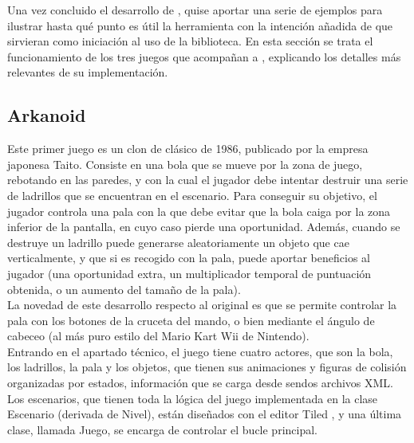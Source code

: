 



Una vez concluido el desarrollo de , quise aportar una serie de ejemplos para ilustrar hasta qué punto es útil la herramienta con la intención añadida de que sirvieran como iniciación al uso de la biblioteca. En esta sección se trata el funcionamiento de los tres juegos que acompañan a , explicando los detalles más relevantes de su implementación.

\subsection{Arkanoid}

Este primer juego es un clon de clásico de 1986, publicado por la empresa japonesa Taito. Consiste en una bola que se mueve por la zona de juego, rebotando en las paredes, y con la cual el jugador debe intentar destruir una serie de ladrillos que se encuentran en el escenario. Para conseguir su objetivo, el jugador controla una pala con la que debe evitar que la bola caiga por la zona inferior de la pantalla, en cuyo caso pierde una oportunidad. Además, cuando se destruye un ladrillo puede generarse aleatoriamente un objeto que cae verticalmente, y que si es recogido con la pala, puede aportar beneficios al jugador (una oportunidad extra, un multiplicador temporal de puntuación obtenida, o un aumento del tamaño de la pala).\\

La novedad de este desarrollo respecto al original es que se permite controlar la pala con los botones de la cruceta del mando, o bien mediante el ángulo de cabeceo (al más puro estilo del Mario Kart Wii de Nintendo).\\

Entrando en el apartado técnico, el juego tiene cuatro actores, que son la bola, los ladrillos, la pala y los objetos, que tienen sus animaciones y figuras de colisión organizadas por estados, información que se carga desde sendos archivos XML. Los escenarios, que tienen toda la lógica del juego implementada en la clase Escenario (derivada de Nivel), están diseñados con el editor Tiled \cite{website:tiled}, y una última clase, llamada Juego, se encarga de controlar el bucle principal.\\

